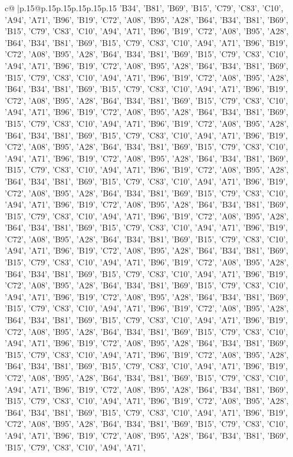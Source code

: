 \documentclass{article}
\begin{document}
{\begin{supertabular}{c@{$\;$}|p{.15\linewidth}@{}p{.15\linewidth}p{.15\linewidth}p{.15\linewidth}p{.15\linewidth}p{.15\linewidth}}
{{{{{'B34', 'B81', 'B69', 'B15', 'C79', 'C83', 'C10', 'A94', 'A71', 'B96', 'B19', 'C72', 'A08', 'B95', 'A28', 'B64', 'B34', 'B81', 'B69', 'B15', 'C79', 'C83', 'C10', 'A94', 'A71', 'B96', 'B19', 'C72', 'A08', 'B95', 'A28', 'B64', 'B34', 'B81', 'B69', 'B15', 'C79', 'C83', 'C10', 'A94', 'A71', 'B96', 'B19', 'C72', 'A08', 'B95', 'A28', 'B64', 'B34', 'B81', 'B69', 'B15', 'C79', 'C83', 'C10', 'A94', 'A71', 'B96', 'B19', 'C72', 'A08', 'B95', 'A28', 'B64', 'B34', 'B81', 'B69', 'B15', 'C79', 'C83', 'C10', 'A94', 'A71', 'B96', 'B19', 'C72', 'A08', 'B95', 'A28', 'B64', 'B34', 'B81', 'B69', 'B15', 'C79', 'C83', 'C10', 'A94', 'A71', 'B96', 'B19', 'C72', 'A08', 'B95', 'A28', 'B64', 'B34', 'B81', 'B69', 'B15', 'C79', 'C83', 'C10', 'A94', 'A71', 'B96', 'B19', 'C72', 'A08', 'B95', 'A28', 'B64', 'B34', 'B81', 'B69', 'B15', 'C79', 'C83', 'C10', 'A94', 'A71', 'B96', 'B19', 'C72', 'A08', 'B95', 'A28', 'B64', 'B34', 'B81', 'B69', 'B15', 'C79', 'C83', 'C10', 'A94', 'A71', 'B96', 'B19', 'C72', 'A08', 'B95', 'A28', 'B64', 'B34', 'B81', 'B69', 'B15', 'C79', 'C83', 'C10', 'A94', 'A71', 'B96', 'B19', 'C72', 'A08', 'B95', 'A28', 'B64', 'B34', 'B81', 'B69', 'B15', 'C79', 'C83', 'C10', 'A94', 'A71', 'B96', 'B19', 'C72', 'A08', 'B95', 'A28', 'B64', 'B34', 'B81', 'B69', 'B15', 'C79', 'C83', 'C10', 'A94', 'A71', 'B96', 'B19', 'C72', 'A08', 'B95', 'A28', 'B64', 'B34', 'B81', 'B69', 'B15', 'C79', 'C83', 'C10', 'A94', 'A71', 'B96', 'B19', 'C72', 'A08', 'B95', 'A28', 'B64', 'B34', 'B81', 'B69', 'B15', 'C79', 'C83', 'C10', 'A94', 'A71', 'B96', 'B19', 'C72', 'A08', 'B95', 'A28', 'B64', 'B34', 'B81', 'B69', 'B15', 'C79', 'C83', 'C10', 'A94', 'A71', 'B96', 'B19', 'C72', 'A08', 'B95', 'A28', 'B64', 'B34', 'B81', 'B69', 'B15', 'C79', 'C83', 'C10', 'A94', 'A71', 'B96', 'B19', 'C72', 'A08', 'B95', 'A28', 'B64', 'B34', 'B81', 'B69', 'B15', 'C79', 'C83', 'C10', 'A94', 'A71', 'B96', 'B19', 'C72', 'A08', 'B95', 'A28', 'B64', 'B34', 'B81', 'B69', 'B15', 'C79', 'C83', 'C10', 'A94', 'A71', 'B96', 'B19', 'C72', 'A08', 'B95', 'A28', 'B64', 'B34', 'B81', 'B69', 'B15', 'C79', 'C83', 'C10', 'A94', 'A71', 'B96', 'B19', 'C72', 'A08', 'B95', 'A28', 'B64', 'B34', 'B81', 'B69', 'B15', 'C79', 'C83', 'C10', 'A94', 'A71', 'B96', 'B19', 'C72', 'A08', 'B95', 'A28', 'B64', 'B34', 'B81', 'B69', 'B15', 'C79', 'C83', 'C10', 'A94', 'A71', 'B96', 'B19', 'C72', 'A08', 'B95', 'A28', 'B64', 'B34', 'B81', 'B69', 'B15', 'C79', 'C83', 'C10', 'A94', 'A71', 'B96', 'B19', 'C72', 'A08', 'B95', 'A28', 'B64', 'B34', 'B81', 'B69', 'B15', 'C79', 'C83', 'C10', 'A94', 'A71', 'B96', 'B19', 'C72', 'A08', 'B95', 'A28', 'B64', 'B34', 'B81', 'B69', 'B15', 'C79', 'C83', 'C10', 'A94', 'A71', 'B96', 'B19', 'C72', 'A08', 'B95', 'A28', 'B64', 'B34', 'B81', 'B69', 'B15', 'C79', 'C83', 'C10', 'A94', 'A71', 'B96', 'B19', 'C72', 'A08', 'B95', 'A28', 'B64', 'B34', 'B81', 'B69', 'B15', 'C79', 'C83', 'C10', 'A94', 'A71', 'B96', 'B19', 'C72', 'A08', 'B95', 'A28', 'B64', 'B34', 'B81', 'B69', 'B15', 'C79', 'C83', 'C10', 'A94', 'A71', 'B96', 'B19', 'C72', 'A08', 'B95', 'A28', 'B64', 'B34', 'B81', 'B69', 'B15', 'C79', 'C83', 'C10', 'A94', 'A71', 'B96', 'B19', 'C72', 'A08', 'B95', 'A28', 'B64', 'B34', 'B81', 'B69', 'B15', 'C79', 'C83', 'C10', 'A94', 'A71', }}}}}
\end{supertabular}}
\end{document}
